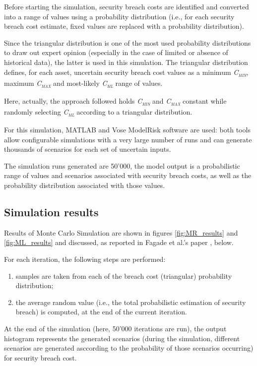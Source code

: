 Before starting the simulation, security breach costs are identified and converted into a range of values using a probability distribution (i.e., for each security breach cost estimate, fixed values are replaced with a probability distribution).

Since the triangular distribution is one of the most used probability distributions to draw out expert opinion (especially in the case of limited or absence of historical data), the latter is used in this simulation.
The triangular distribution defines, for each asset, uncertain security breach cost values as a minimum \textsc{\textit{C\textsubscript{min}}}, maximum \textsc{\textit{C\textsubscript{max}}} and most-likely \textsc{\textit{C\textsubscript{ml}}} range of values.

Here, actually, the approach followed holds \textsc{\textit{C\textsubscript{min}}} and \textsc{\textit{C\textsubscript{max}}} constant while randomly selecting \textsc{\textit{C\textsubscript{ml}}} according to a triangular distribution.

For this simulation, MATLAB \parencite{MATLAB} and Vose ModelRisk software \parencite{ModelRisk} are used: both tools allow configurable simulations with a very large number of runs and can generate thousands of scenarios for each set of uncertain inputs.

The simulation runs generated are 50'000, the model output is a probabilistic range of values and scenarios associated with security breach costs, as well as the probability distribution associated with those values.

\subsection{Simulation results}
Results of Monte Carlo Simulation are shown in figures  \ref{fig:MR_results} and  \ref{fig:ML_results} and discussed, as reported in Fagade et al.'s paper \parencite{Fagade}, below.

For each iteration, the following steps are performed:
\begin{enumerate}
    \item samples are taken from each of the breach cost (triangular) probability distribution;
    \item the average random value (i.e., the total probabilistic estimation of security breach) is computed, at the end of the current iteration.
\end{enumerate}
At the end of the simulation (here, 50'000 iterations are run), the output histogram represents the generated scenarios (during the simulation, different scenarios are generated asccording to the probability of those scenarios occurring) for security breach cost.

